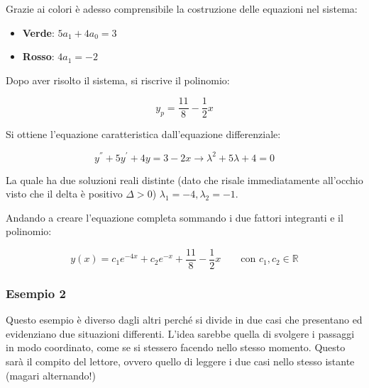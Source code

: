 \documentclass[a4paper]{article}
\begin{document}
	\noindent
	Grazie ai colori è adesso comprensibile la costruzione delle equazioni nel sistema:
	
	\begin{itemize}
		\item \textcolor{Green4}{\textbf{Verde}}: $5a_{1} + 4a_{0} = 3$
		\item \textcolor{Red3}{\textbf{Rosso}}: $4a_{1} = -2$
	\end{itemize}

	\noindent
	Dopo aver risolto il sistema, si riscrive il polinomio:
	
	\begin{equation*}
		y_{p} = \dfrac{11}{8} - \dfrac{1}{2}x
	\end{equation*}

	\noindent
	Si ottiene l'equazione caratteristica dall'equazione differenziale:
	
	\begin{equation*}
		y^{''} + 5y^{'} + 4y = 3 - 2x \longrightarrow \lambda^{2} + 5\lambda + 4 = 0
	\end{equation*}

	\noindent
	La quale ha due soluzioni reali distinte (dato che risale immediatamente all'occhio visto che il delta è positivo $\Delta > 0$) $\lambda_{1} = -4, \lambda_{2} = -1$.\newline
	
	\noindent
	Andando a creare l'equazione completa sommando i due fattori integranti e il polinomio:
	
	\begin{equation*}
		y\left(x\right) = c_{1}e^{-4x} + c_{2}e^{-x} + \dfrac{11}{8} - \dfrac{1}{2} x \hspace{2em} \text{con } c_{1}, c_{2} \in \mathbb{R}
	\end{equation*}

	\newpage
	
	\subsubsection[Esempio 2]{\textcolor{Green4}{Esempio 2}}
	
	Questo esempio è diverso dagli altri perché si divide in due casi che presentano ed evidenziano due situazioni differenti. L'idea sarebbe quella di svolgere i passaggi in modo coordinato, come se si stessero facendo nello stesso momento. Questo sarà il compito del lettore, ovvero quello di leggere i due casi nello stesso istante (magari alternando!)
	
\end{document}
